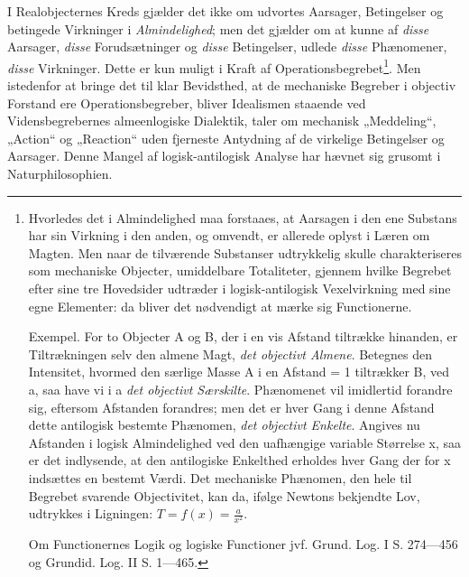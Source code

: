 \documentclass[12pt]{book}
\newcommand{\opage}[1]{\marginnote{\footnotesize\textit{[#1]}}}
\begin{document}
I Realobjecternes Kreds gjælder det ikke om udvortes Aarsager,
Betingelser og betingede Virkninger i \emph{Almindelighed}; men det
gjælder om at kunne af \emph{disse} Aarsager, \emph{disse}
Forudsætninger og \emph{disse} Betingelser, udlede \emph{disse}
Phænomener, \emph{disse} Virkninger. Dette er kun muligt i Kraft af
Operationsbegrebet\footnote{Hvorledes det i Almindelighed maa
forstaaes, at Aarsagen i den ene Substans har sin Virkning i den
anden, og omvendt, er allerede oplyst i Læren om Magten. Men naar de
tilværende Substanser udtrykkelig skulle charakteriseres som
mechaniske Objecter, umiddelbare Totaliteter, gjennem hvilke
Begrebet efter sine tre Hovedsider udtræder i logisk-antilogisk
Vexelvirkning med sine egne Elementer: da bliver det nødvendigt at
mærke sig Functionerne.

Exempel. For to Objecter A og B, der i en vis Afstand tiltrække
hinanden, er Tiltrækningen selv den almene Magt, \emph{det objectivt
Almene}. Betegnes den Intensitet, hvormed den særlige Masse A i en
Afstand = 1 tiltrækker B, ved a, saa have vi i a \emph{det objectivt
Særskilte}. Phænomenet vil imidlertid forandre sig, eftersom
Afstanden forandres; men det er hver Gang i denne Afstand dette
antilogisk bestemte Phænomen, \emph{det objectivt Enkelte}. Angives
nu Afstanden i logisk Almindelighed ved den uafhængige variable
Størrelse x, saa er det indlysende, at den antilogiske Enkelthed
erholdes hver Gang der for x indsættes en bestemt Værdi. Det
mechaniske Phænomen, den hele til Begrebet svarende Objectivitet,
kan da, ifølge Newtons bekjendte Lov, udtrykkes i Ligningen:
$T = f(x) = \frac{a}{x^{2}}$.

Om Functionernes Logik og logiske Functioner jvf. Grund. Log. I
S. 274---456 og Grundid. Log. II S. 1---465.}. Men istedenfor at
bringe
\opage{69} det til klar Bevidsthed, at de mechaniske Begreber i objectiv
Forstand ere Operationsbegreber, bliver Idealismen staaende ved
Vidensbegrebernes almeenlogiske Dialektik, taler om mechanisk
„Meddeling“, „Action“ og „Reaction“ uden fjerneste Antydning af de
virkelige Betingelser og Aarsager. Denne Mangel af logisk-antilogisk
Analyse har hævnet sig grusomt i Naturphilosophien.
\end{document}
